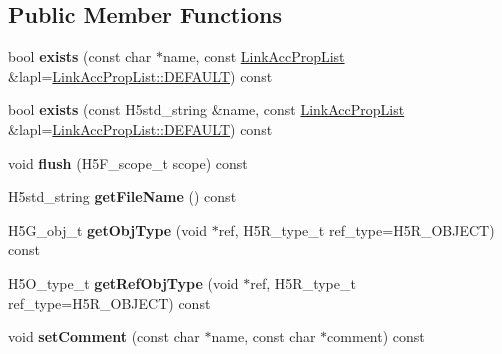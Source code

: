 \subsection*{Public Member Functions}
\begin{DoxyCompactItemize}
\item 
\mbox{\label{class_h5_1_1_h5_location_a6556c6f3718bb137af4356e33c0cfa4e}} 
bool {\bfseries exists} (const char $\ast$name, const \hyperlink{class_h5_1_1_link_acc_prop_list}{Link\+Acc\+Prop\+List} \&lapl=\hyperlink{class_h5_1_1_link_acc_prop_list_abbf34b03d8f8c9cf225c704d59ebb7a8}{Link\+Acc\+Prop\+List\+::\+D\+E\+F\+A\+U\+LT}) const
\item 
\mbox{\label{class_h5_1_1_h5_location_a9ca7f994ac110ecb1068151fbd7ee903}} 
bool {\bfseries exists} (const H5std\+\_\+string \&name, const \hyperlink{class_h5_1_1_link_acc_prop_list}{Link\+Acc\+Prop\+List} \&lapl=\hyperlink{class_h5_1_1_link_acc_prop_list_abbf34b03d8f8c9cf225c704d59ebb7a8}{Link\+Acc\+Prop\+List\+::\+D\+E\+F\+A\+U\+LT}) const
\item 
\mbox{\label{class_h5_1_1_h5_location_a9aff2dcb1b3903f5e3194aa223b724ac}} 
void {\bfseries flush} (H5\+F\+\_\+scope\+\_\+t scope) const
\item 
\mbox{\label{class_h5_1_1_h5_location_a34592dfe7d753a2fc1af2986a452007e}} 
H5std\+\_\+string {\bfseries get\+File\+Name} () const
\item 
\mbox{\label{class_h5_1_1_h5_location_a7d7779a82e345180f2a39042882fab5a}} 
H5\+G\+\_\+obj\+\_\+t {\bfseries get\+Obj\+Type} (void $\ast$ref, H5\+R\+\_\+type\+\_\+t ref\+\_\+type=H5\+R\+\_\+\+O\+B\+J\+E\+CT) const
\item 
\mbox{\label{class_h5_1_1_h5_location_a06704fce2de49d9c88409dbd0d8efb90}} 
H5\+O\+\_\+type\+\_\+t {\bfseries get\+Ref\+Obj\+Type} (void $\ast$ref, H5\+R\+\_\+type\+\_\+t ref\+\_\+type=H5\+R\+\_\+\+O\+B\+J\+E\+CT) const
\item 
\mbox{\label{class_h5_1_1_h5_location_a7864d2e28fc4053c35d7c20af748d39b}} 
void {\bfseries set\+Comment} (const char $\ast$name, const char $\ast$comment) const

\end{DoxyCompactItemize}
